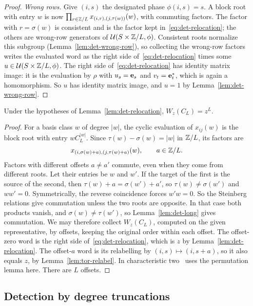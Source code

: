 \begin{proof}
\emph{Wrong rows.} Give $(i,s)$ the designated phase $\phi(i,s)=s$. A block root with entry $w$ is now
$\prod_{r\in\mathbb Z/L}x_{(i,r),(j,\tau(w))}(w)$, with commuting factors. The factor with $r=\sigma(w)$ is consistent and is the
factor kept in~\eqref{eq:det-relocation}; the others are wrong-row generators of $\mathcal U(S\times\mathbb Z/L,\phi)$.
Consistent roots normalize this subgroup (Lemma~\ref{lem:det-wrong-row}), so collecting the wrong-row factors writes the
evaluated word as the right side of~\eqref{eq:det-relocation} times some $u\in\mathcal U(S\times\mathbb Z/L,\phi)$. The right
side of~\eqref{eq:det-relocation} has identity matrix image: it is the evaluation by $\rho$ with $u_s=\mathbf e_s$ and
$v_t=\mathbf e_t^*$, which is again a homomorphism. So $u$ has identity matrix image, and $u=1$ by
Lemma~\ref{lem:det-wrong-row}.
\end{proof}

\begin{proposition}\label{prop:det-power}
Under the hypotheses of Lemma~\ref{lem:det-relocation}, $W_z(C_L)=z^L$.
\end{proposition}

\begin{proof}
For a basis class $w$ of degree $|w|$, the cyclic evaluation of $x_{ij}(w)$ is the block root with entry $wC_L^{|w|}$.
Since $\tau(w)-\sigma(w)=|w|$ in $\mathbb Z/L$, its factors are
\[
 x_{(i,\sigma(w)+a),(j,\tau(w)+a)}(w),\qquad a\in\mathbb Z/L.
\]
Factors with different offsets $a\neq a'$ commute, even when they come from different roots. Let their entries be $w$
and $w'$. If the target of the first is the source of the second, then $\tau(w)+a=\sigma(w')+a'$, so
$\tau(w)\neq\sigma(w')$ and $ww'=0$. Symmetrically, the reverse coincidence forces $w'w=0$. So the Steinberg relations
give commutation unless the two roots are opposite. In that case both products vanish, and $\sigma(w)\neq\tau(w')$, so
Lemma~\ref{lem:det-long} gives commutation. We may therefore collect $W_z(C_L)$, computed on the given representative, by
offsets, keeping the original order within each offset. The offset-zero word is the right side
of~\eqref{eq:det-relocation}, which is $z$ by Lemma~\ref{lem:det-relocation}. The offset-$a$ word is its relabelling by
$(i,s)\mapsto(i,s+a)$, so it also equals $z$, by Lemma~\ref{lem:tor-relabel}. In characteristic two~\cite{OAI247rf} uses
the permutation lemma here. There are $L$ offsets.
\end{proof}

\subsection{Detection by degree truncations}

